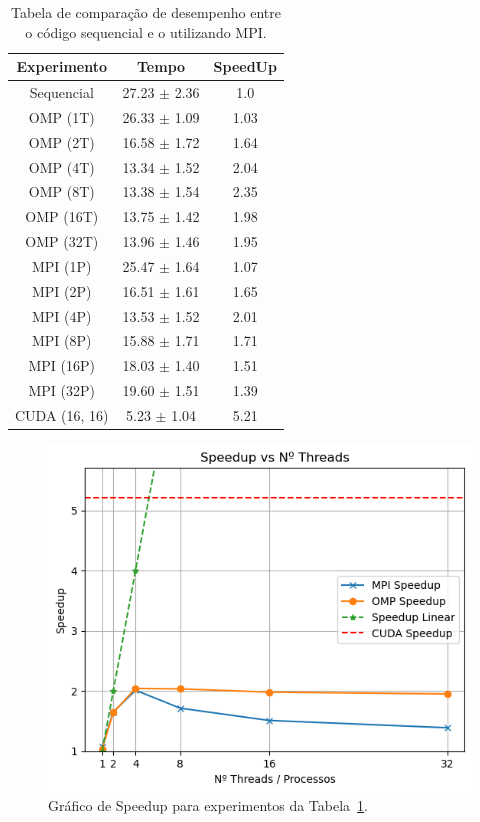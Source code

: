 \documentclass[12pt]{article}
\begin{document}
\begin{table}[ht]
  \centering
  \caption{Tabela de comparação de desempenho entre o código sequencial e o
    utilizando MPI.}\label{tab:Resultados}
  \vspace{0.3cm}
  \begin{tabular}{||c c c||}
    \hline
    Experimento   & Tempo            & SpeedUp \\ [0.5ex]
    \hline\hline
    Sequencial    & 27.23 $\pm$ 2.36 & 1.0     \\
    \hline
    OMP (1T)      & 26.33 $\pm$ 1.09 & 1.03    \\
    \hline
    OMP (2T)      & 16.58 $\pm$ 1.72 & 1.64    \\
    \hline
    OMP (4T)      & 13.34 $\pm$ 1.52 & 2.04    \\
    \hline
    OMP (8T)      & 13.38 $\pm$ 1.54 & 2.35    \\
    \hline
    OMP (16T)     & 13.75 $\pm$ 1.42 & 1.98    \\
    \hline
    OMP (32T)     & 13.96 $\pm$ 1.46 & 1.95    \\
    \hline
    MPI (1P)      & 25.47 $\pm$ 1.64 & 1.07    \\
    \hline
    MPI (2P)      & 16.51 $\pm$ 1.61 & 1.65    \\
    \hline
    MPI (4P)      & 13.53 $\pm$ 1.52 & 2.01    \\
    \hline
    MPI (8P)      & 15.88 $\pm$ 1.71 & 1.71    \\
    \hline
    MPI (16P)     & 18.03 $\pm$ 1.40 & 1.51    \\
    \hline
    MPI (32P)     & 19.60 $\pm$ 1.51 & 1.39    \\
    \hline
    CUDA (16, 16) & 5.23 $\pm$ 1.04  & 5.21    \\
    \hline
  \end{tabular}
\end{table}

\begin{figure}[ht]
  \centering
  \includegraphics[width=.55\textwidth]{figs/speedupxthreads.png}
  \caption{Gráfico de Speedup para experimentos da Tabela~\ref{tab:Resultados}.}\label{fig:speedupxthread}
\end{figure}
\end{document}

